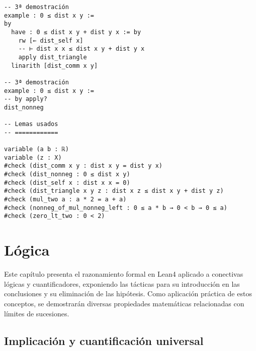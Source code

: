 \begin{verbatim}
-- 3ª demostración
example : 0 ≤ dist x y :=
by
  have : 0 ≤ dist x y + dist y x := by
    rw [← dist_self x]
    -- ⊢ dist x x ≤ dist x y + dist y x
    apply dist_triangle
  linarith [dist_comm x y]

-- 3ª demostración
example : 0 ≤ dist x y :=
-- by apply?
dist_nonneg

-- Lemas usados
-- ============

variable (a b : ℝ)
variable (z : X)
#check (dist_comm x y : dist x y = dist y x)
#check (dist_nonneg : 0 ≤ dist x y)
#check (dist_self x : dist x x = 0)
#check (dist_triangle x y z : dist x z ≤ dist x y + dist y z)
#check (mul_two a : a * 2 = a + a)
#check (nonneg_of_mul_nonneg_left : 0 ≤ a * b → 0 < b → 0 ≤ a)
#check (zero_lt_two : 0 < 2)
\end{verbatim}

\chapter{Lógica}
\label{sec:org8a19dfe}

Este capítulo presenta el razonamiento formal en Lean4 aplicado a
conectivas lógicas y cuantificadores, exponiendo las tácticas para su
introducción en las conclusiones y su eliminación de las hipótesis. Como
aplicación práctica de estos conceptos, se demostrarán diversas
propiedades matemáticas relacionadas con límites de sucesiones.

\section{Implicación y cuantificación universal}
\label{sec:org5e37fce}

